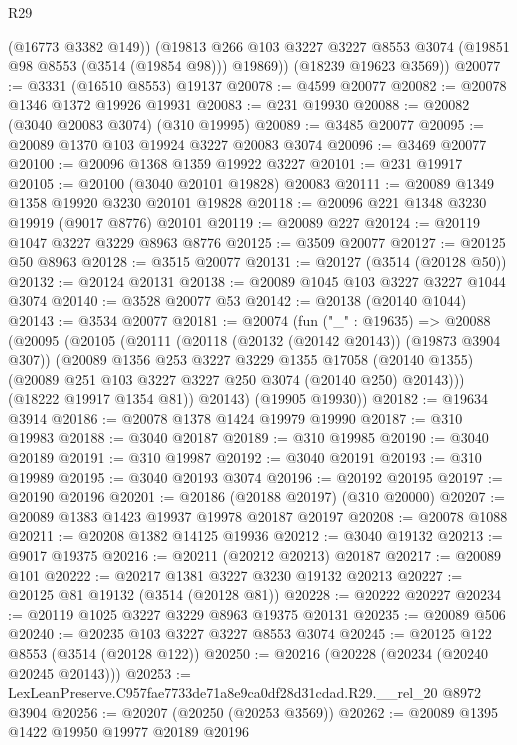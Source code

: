 \begin{lexlean}{R29}
\begin{coremodule}
          (@16773 @3382 @149))
        (@19813 @266 @103 @3227 @3227 @8553 @3074 (@19851 @98 @8553 (@3514 (@19854 @98))) @19869))
      (@18239 @19623 @3569))
@20077 := @3331 (@16510 @8553) @19137
@20078 := @4599 @20077
@20082 := @20078 @1346 @1372 @19926 @19931
@20083 := @231 @19930
@20088 := @20082 (@3040 @20083 @3074) (@310 @19995)
@20089 := @3485 @20077
@20095 := @20089 @1370 @103 @19924 @3227 @20083 @3074
@20096 := @3469 @20077
@20100 := @20096 @1368 @1359 @19922 @3227
@20101 := @231 @19917
@20105 := @20100 (@3040 @20101 @19828) @20083
@20111 := @20089 @1349 @1358 @19920 @3230 @20101 @19828
@20118 := @20096 @221 @1348 @3230 @19919 (@9017 @8776) @20101
@20119 := @20089 @227
@20124 := @20119 @1047 @3227 @3229 @8963 @8776
@20125 := @3509 @20077
@20127 := @20125 @50 @8963
@20128 := @3515 @20077
@20131 := @20127 (@3514 (@20128 @50))
@20132 := @20124 @20131
@20138 := @20089 @1045 @103 @3227 @3227 @1044 @3074
@20140 := @3528 @20077 @53
@20142 := @20138 (@20140 @1044)
@20143 := @3534 @20077
@20181 := @20074
    (fun ("_" : @19635) =>
    @20088
      (@20095
        (@20105
          (@20111
            (@20118 (@20132 (@20142 @20143)) (@19873 @3904 @307))
            (@20089
              @1356
              @253
              @3227
              @3229
              @1355
              @17058
              (@20140 @1355)
              (@20089 @251 @103 @3227 @3227 @250 @3074 (@20140 @250) @20143)))
          (@18222 @19917 @1354 @81))
        @20143)
      (@19905 @19930))
@20182 := @19634 @3914
@20186 := @20078 @1378 @1424 @19979 @19990
@20187 := @310 @19983
@20188 := @3040 @20187
@20189 := @310 @19985
@20190 := @3040 @20189
@20191 := @310 @19987
@20192 := @3040 @20191
@20193 := @310 @19989
@20195 := @3040 @20193 @3074
@20196 := @20192 @20195
@20197 := @20190 @20196
@20201 := @20186 (@20188 @20197) (@310 @20000)
@20207 := @20089 @1383 @1423 @19937 @19978 @20187 @20197
@20208 := @20078 @1088
@20211 := @20208 @1382 @14125 @19936
@20212 := @3040 @19132
@20213 := @9017 @19375
@20216 := @20211 (@20212 @20213) @20187
@20217 := @20089 @101
@20222 := @20217 @1381 @3227 @3230 @19132 @20213
@20227 := @20125 @81 @19132 (@3514 (@20128 @81))
@20228 := @20222 @20227
@20234 := @20119 @1025 @3227 @3229 @8963 @19375 @20131
@20235 := @20089 @506
@20240 := @20235 @103 @3227 @3227 @8553 @3074
@20245 := @20125 @122 @8553 (@3514 (@20128 @122))
@20250 := @20216 (@20228 (@20234 (@20240 @20245 @20143)))
@20253 := LexLeanPreserve.C957fae7733de71a8e9ca0df28d31cdad.R29.__rel_20 @8972 @3904
@20256 := @20207 (@20250 (@20253 @3569))
@20262 := @20089 @1395 @1422 @19950 @19977 @20189 @20196

\end{coremodule}
\end{lexlean}
